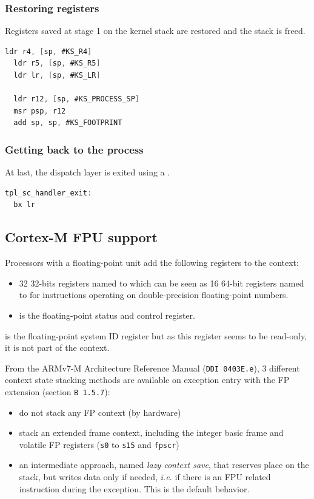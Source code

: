 \subsubsection{Restoring registers}

Registers saved at stage 1 on the kernel stack are restored and the stack is freed.

\begin{lstlisting}[language=C]
  ldr r4, [sp, #KS_R4]
  ldr r5, [sp, #KS_R5]
  ldr lr, [sp, #KS_LR]

  ldr r12, [sp, #KS_PROCESS_SP]
  msr psp, r12
  add sp, sp, #KS_FOOTPRINT	
\end{lstlisting}

\subsubsection{Getting back to the process}

At last, the dispatch layer is exited using a .

\begin{lstlisting}[language=C]
tpl_sc_handler_exit:
  bx lr
\end{lstlisting}

\subsection{Cortex-M FPU support}

Processors with a floating-point unit add the following registers to the context:
\begin{itemize}
\item 32 32-bits registers named  to  which can be seen as 16 64-bit registers named  to  for instructions operating on double-precision floating-point numbers.
\item {} is the floating-point status and control register.
\end{itemize}

 is the floating-point system ID register but as this register seems to be read-only, it is not part of the context.

From the ARMv7-M Architecture Reference Manual (\texttt{DDI 0403E.e}), 3 different context state stacking methods are available on exception entry with the FP extension (section \texttt{B 1.5.7}):
\begin{itemize}
  \item do not stack any FP context (by hardware)
  \item stack an extended frame context, including the integer basic frame and volatile FP registers (\texttt{s0} to \texttt{s15} and \texttt{fpscr})
  \item an intermediate approach, named \textsl{lazy context save}, that reserves place on the stack, but writes data only if needed, \textsl{i.e.} if there is an FPU related instruction during the exception. This is the default behavior.
\end{itemize}

